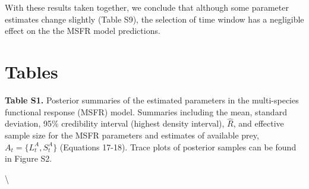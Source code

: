 \documentclass[
]{article}
\begin{document}
With these results taken together, we conclude that although some
parameter estimates change slightly (Table S9), the selection of time
window has a negligible effect on the the MSFR model predictions.

\newpage

\section{Tables}\label{tables}

\textbf{Table S1.} Posterior summaries of the estimated parameters in
the multi-species functional response (MSFR) model. Summaries including
the mean, standard deviation, 95\% credibility interval (highest density
interval), \(\hat{R}\), and effective sample size for the MSFR
parameters and estimates of available prey, \(A_t = \{L_t^A, S_t^A\}\)
(Equations 17-18). Trace plots of posterior samples can be found in
Figure S2.

\textbackslash{} \renewcommand{\arraystretch}{2}
\end{document}
